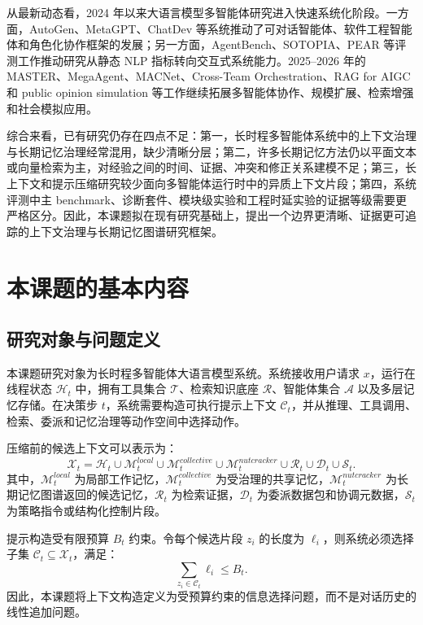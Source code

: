 \documentclass[UTF8,a4paper,zihao=-4,fontset=windows]{ctexart}
\begin{document}
从最新动态看，2024 年以来大语言模型多智能体研究进入快速系统化阶段。一方面，AutoGen、MetaGPT、ChatDev 等系统推动了可对话智能体、软件工程智能体和角色化协作框架的发展；另一方面，AgentBench、SOTOPIA、PEAR 等评测工作推动研究从静态 NLP 指标转向交互式系统能力。2025--2026 年的 MASTER、MegaAgent、MACNet、Cross-Team Orchestration、RAG for AIGC 和 public opinion simulation 等工作继续拓展多智能体协作、规模扩展、检索增强和社会模拟应用。

综合来看，已有研究仍存在四点不足：第一，长时程多智能体系统中的上下文治理与长期记忆治理经常混用，缺少清晰分层；第二，许多长期记忆方法仍以平面文本或向量检索为主，对经验之间的时间、证据、冲突和修正关系建模不足；第三，长上下文和提示压缩研究较少面向多智能体运行时中的异质上下文片段；第四，系统评测中主 benchmark、诊断套件、模块级实验和工程时延实验的证据等级需要更严格区分。因此，本课题拟在现有研究基础上，提出一个边界更清晰、证据更可追踪的上下文治理与长期记忆图谱研究框架。

\section{本课题的基本内容}

\subsection{研究对象与问题定义}

本课题研究对象为长时程多智能体大语言模型系统。系统接收用户请求 $x$，运行在线程状态 $\mathcal{H}_t$ 中，拥有工具集合 $\mathcal{T}$、检索知识底座 $\mathcal{R}$、智能体集合 $\mathcal{A}$ 以及多层记忆存储。在决策步 $t$，系统需要构造可执行提示上下文 $\mathcal{C}_t$，并从推理、工具调用、检索、委派和记忆治理等动作空间中选择动作。

压缩前的候选上下文可以表示为：
\[
\mathcal{X}_t=\mathcal{H}_t \cup \mathcal{M}^{local}_t \cup \mathcal{M}^{collective}_t \cup \mathcal{M}^{nutcracker}_t \cup \mathcal{R}_t \cup \mathcal{D}_t \cup \mathcal{S}_t.
\]
其中，$\mathcal{M}^{local}_t$ 为局部工作记忆，$\mathcal{M}^{collective}_t$ 为受治理的共享记忆，$\mathcal{M}^{nutcracker}_t$ 为长期记忆图谱返回的候选记忆，$\mathcal{R}_t$ 为检索证据，$\mathcal{D}_t$ 为委派数据包和协调元数据，$\mathcal{S}_t$ 为策略指令或结构化控制片段。

提示构造受有限预算 $B_t$ 约束。令每个候选片段 $z_i$ 的长度为 $\ell_i$，则系统必须选择子集 $\mathcal{C}_t \subseteq \mathcal{X}_t$，满足：
\[
\sum_{z_i \in \mathcal{C}_t} \ell_i \leq B_t.
\]
因此，本课题将上下文构造定义为受预算约束的信息选择问题，而不是对话历史的线性追加问题。
\end{document}
